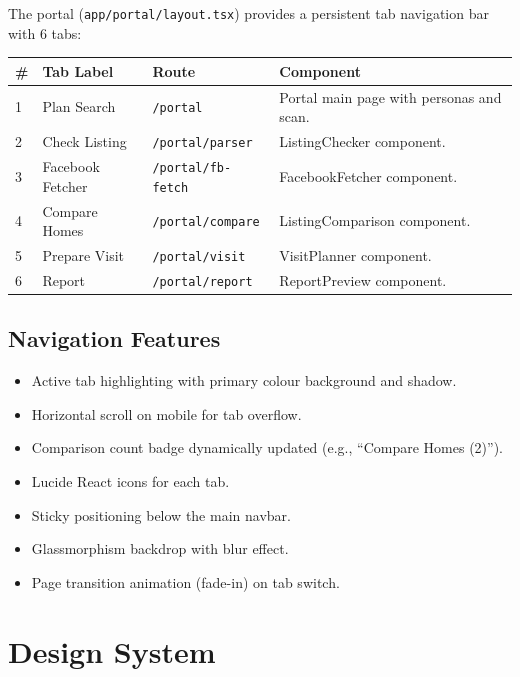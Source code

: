 \documentclass[12pt, a4paper, oneside]{report}
\newcommand{\filepath}[1]{\texttt{\small\color{codeblue}#1}}
\begin{document}
The portal (\filepath{app/portal/layout.tsx}) provides a persistent tab navigation bar with 6 tabs:

\begin{longtable}{p{1cm} p{3.5cm} p{3cm} p{5cm}}
\toprule
\textbf{\#} & \textbf{Tab Label} & \textbf{Route} & \textbf{Component} \\
\midrule
\endhead
1 & Plan Search & \texttt{/portal} & Portal main page with personas and scan. \\
2 & Check Listing & \texttt{/portal/parser} & ListingChecker component. \\
3 & Facebook Fetcher & \texttt{/portal/fb-fetch} & FacebookFetcher component. \\
4 & Compare Homes & \texttt{/portal/compare} & ListingComparison component. \\
5 & Prepare Visit & \texttt{/portal/visit} & VisitPlanner component. \\
6 & Report & \texttt{/portal/report} & ReportPreview component. \\
\bottomrule
\end{longtable}

\section{Navigation Features}

\begin{itemize}[leftmargin=2em]
  \item Active tab highlighting with primary colour background and shadow.
  \item Horizontal scroll on mobile for tab overflow.
  \item Comparison count badge dynamically updated (e.g., ``Compare Homes (2)'').
  \item Lucide React icons for each tab.
  \item Sticky positioning below the main navbar.
  \item Glassmorphism backdrop with blur effect.
  \item Page transition animation (fade-in) on tab switch.
\end{itemize}


\chapter{Design System}
\end{document}
